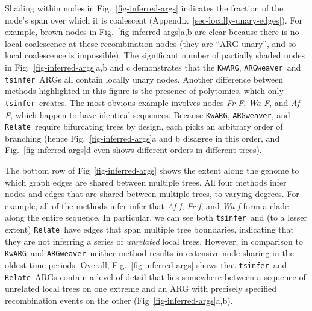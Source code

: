 \documentclass[9pt,twocolumn,twoside]{gsajnl}
\newcommand{\noderef}[1]{\textit{#1}}
\newcommand{\tsinfer}[0]{\texttt{tsinfer}}
\newcommand{\kwarg}[0]{\texttt{KwARG}}
\newcommand{\argweaver}[0]{\texttt{ARGweaver}}
\newcommand{\relate}[0]{\texttt{Relate}}
\begin{document}
Shading within nodes in Fig.~\ref{fig-inferred-args} indicates the
fraction of the node's span over which it is coalescent
(Appendix~\ref{sec-locally-unary-edges}). For example, brown nodes
in Fig.~\ref{fig-inferred-args}a,b are clear because there is
no local coalescence at these recombination nodes
(they are ``ARG unary'', and so local coalescence is impossible).
The significant number of partially shaded nodes in
Fig.~\ref{fig-inferred-args}a,b and c demonstrates that
the \kwarg, \argweaver\ and \tsinfer\ ARGs all contain locally unary nodes.
Another difference between methods highlighted in this figure
is the presence of polytomies, which only
\tsinfer\ creates. The most obvious example
involves nodes \noderef{Fr-F}, \noderef{Wa-F}, and \noderef{Af-F},
which happen to have identical sequences.
Because \kwarg, \argweaver, and \relate\ require
bifurcating trees by design, each picks an arbitrary order of branching
(hence Fig.~\ref{fig-inferred-args}a and b disagree
in this order, and Fig.~\ref{fig-inferred-args}d even shows different
orders in different trees).

The bottom row of Fig~\ref{fig-inferred-args} shows the extent along
the genome to which graph edges are shared between multiple trees.
All four methods infer nodes and edges that are shared between
multiple trees, to varying degrees.
For example, all of the methods infer
infer that \noderef{Af-f}, \noderef{Fr-f}, and \noderef{Wa-f}
form a clade along the entire sequence.
In particular, we can
see both \tsinfer\ and (to a lesser extent) \relate\ have edges
that span multiple tree boundaries, indicating that they are not inferring
a series of \emph{unrelated} local trees.
However, in comparison to \kwarg\ and \argweaver\ neither
method results in extensive node sharing in the
oldest time periods.
Overall, Fig.~\ref{fig-inferred-args} shows
that \tsinfer\ and \relate\ ARGs contain a level of detail
that lies somewhere between a sequence of unrelated local trees on one extreme
and an ARG with precisely specified recombination events on the other
(Fig~\ref{fig-inferred-args}a,b).
\end{document}
